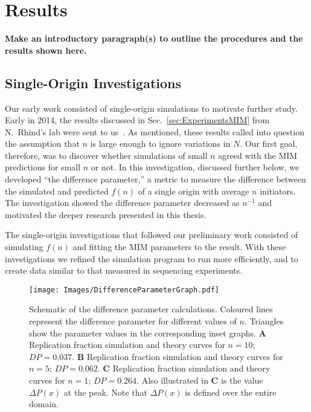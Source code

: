 \chapter{Results}
\label{ch:Results}

\textbf{Make an introductory paragraph(s) to outline the procedures and the results shown here.}

	\section{Single-Origin Investigations}
	\label{sec:SingleOrigin}
	
	Our early work consisted of single-origin simulations to motivate further study.
	Early in 2014, the results discussed in Sec.~\ref{sec:ExperimentsMIM} from N.~Rhind's lab were sent to us~\cite{Rhind}.
	As mentioned, these results called into question the assumption that $n$ is large enough to ignore variations in $N$.
	Our first goal, therefore, was to discover whether simulations of small $n$ agreed with the MIM predictions for small $n$ or not.
	In this investigation, discussed further below, we developed ``the difference parameter,'' a metric to measure the difference between the simulated and predicted $f(n)$ of a single origin with average $n$ initiators.
	The investigation showed the difference parameter decreased as $n^{-1}$ and motivated the deeper research presented in this thesis.
	
	The single-origin investigations that followed our preliminary work consisted of simulating $f(n)$ and fitting the MIM parameters to the result.
	With these investigations we refined the simulation program to run more efficiently, and to create data similar to that measured in sequencing experiments.
		
	\begin{figure}[tbh!]
		\begin{center}
			\texttt{[image: Images/DifferenceParameterGraph.pdf]}
		\end{center}
			\caption[Difference Parameter]{\label{fig:DifferenceParameter} Schematic of the difference parameter calculations.
				Coloured lines represent the difference parameter for different values of $n$.
				Triangles show the parameter values in the corresponding inset graphs.
				\textbf{A} Replication fraction simulation and theory curves for $n=10$; $DP=0.037$.
				\textbf{B} Replication fraction simulation and theory curves for $n=5$; $DP = 0.062$.
				\textbf{C} Replication fraction simulation and theory curves for $n=1$; $DP = 0.264$.
				Also illustrated in \textbf{C} is the value $\Delta P(x)$ at the peak.
				Note that $\Delta P(x)$ is defined over the entire domain.
				}
	\end{figure}
	
